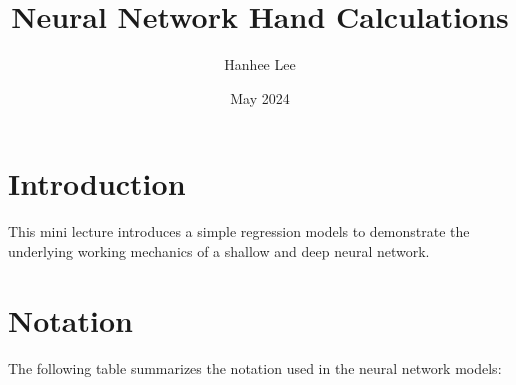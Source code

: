\documentclass{article}
\title{Neural Network Hand Calculations}
\author{Hanhee Lee}
\date{May 2024}
\begin{document}
\maketitle

\section{Introduction}
This mini lecture introduces a simple regression models to demonstrate the underlying working mechanics of a shallow and deep neural network.

\section{Notation}
The following table summarizes the notation used in the neural network models:

\end{document}

